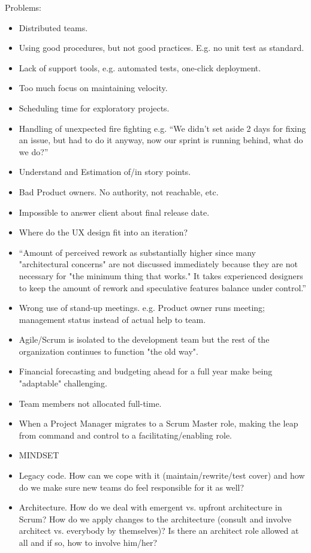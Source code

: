 Problems:
\begin{itemize}
	\item Distributed teams.
	\item Using good procedures, but not good practices. E.g. no unit test as standard.
	\item Lack of support tools, e.g. automated tests, one-click deployment.
	\item Too much focus on maintaining velocity.
	\item Scheduling time for exploratory projects.
	\item Handling of unexpected fire fighting e.g. “We didn't set aside 2 days for fixing an issue, but had to do it anyway, now our sprint is running behind, what do we do?”
	\item Understand and Estimation of/in story points.
	\item Bad Product owners. No authority, not reachable, etc.
	\item Impossible to answer client about final release date.
	\item Where do the UX design fit into an iteration?
	\item “Amount of perceived rework as substantially higher since many "architectural concerns" are not discussed immediately because they are not necessary for "the minimum thing that works." It takes experienced designers to keep the amount of rework and speculative features balance under control.”
	\item Wrong use of stand-up meetings. e.g. Product owner runs meeting; management status instead of actual help to team.
	\item Agile/Scrum is isolated to the development team but the rest of the organization continues to function "the old way".
	\item Financial forecasting and budgeting ahead for a full year make being "adaptable" challenging.
	\item Team members not allocated full-time.
	\item When a Project Manager migrates to a Scrum Master role, making the leap from command and control to a facilitating/enabling role.
	\item MINDSET
	\item Legacy code. How can we cope with it (maintain/rewrite/test cover) and how do we make sure new teams do feel responsible for it as well?
	\item Architecture. How do we deal with emergent vs. upfront architecture in Scrum? How do we apply changes to the architecture (consult and involve architect vs. everybody by themselves)? Is there an architect role allowed at all and if so, how to involve him/her?

\end{itemize}
